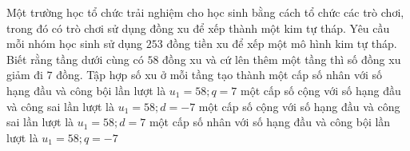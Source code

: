 \begin{ex}
Một trường học tổ chức trải nghiệm cho học sinh bằng cách tổ chức các trò chơi, trong đó có trò chơi sử dụng đồng xu để xếp thành một kim tự tháp. Yêu cầu mỗi nhóm học sinh sử dụng $253$ đồng tiền xu để xếp một mô hình kim tự tháp. Biết rằng tầng dưới cùng có $58$ đồng xu và cứ lên thêm một tầng thì số đồng xu giảm đi $7$ đồng. Tập hợp số xu ở mỗi tầng tạo thành
\choice
{một cấp số nhân với số hạng đầu và công bội lần lượt là $u_1=58;q=7$}
{\True một cấp số cộng với số hạng đầu và công sai lần lượt là $u_1=58;d=-7$}
{một cấp số cộng với số hạng đầu và công sai lần lượt là $u_1=58;d=7$}
{một cấp số nhân với số hạng đầu và công bội lần lượt là $u_1=58;q=-7$}
\end{ex}
